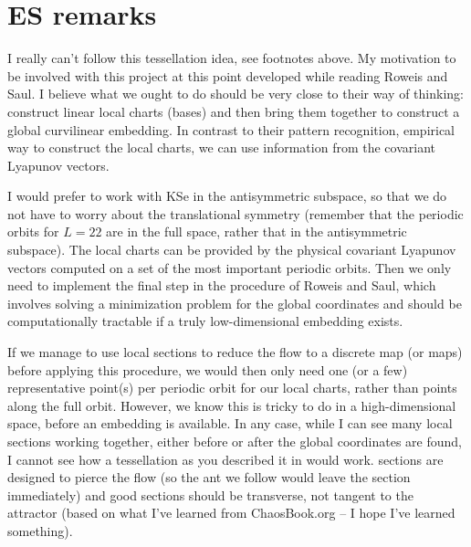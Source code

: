 \section{ES remarks}

I really can't follow this tessellation idea, see footnotes above. 
My motivation to be involved with this project at this point
developed while reading Roweis and Saul. I believe what we ought to 
do should be very close to their way of thinking: 
construct linear local charts (bases) and then bring them together 
to construct a global curvilinear embedding. In contrast to their pattern recognition, 
empirical way to construct the local charts, we can use information from
the covariant Lyapunov vectors.

I would prefer to work with KSe in the antisymmetric subspace, so that we do not
have to worry about the translational symmetry (remember that the periodic
orbits for $L=22$ are in the full space, rather that in the antisymmetric
subspace). 
The local charts can be provided by the physical covariant Lyapunov vectors 
computed on a set of the most important periodic orbits. Then we only need
to implement the final step in the procedure of Roweis and Saul, 
which involves solving a minimization problem for the global coordinates
and should be computationally tractable if a truly
low-dimensional embedding exists.

If we manage to use local {\Poincare} sections to reduce the flow to a discrete map
(or maps) before applying this procedure, we would then only need one (or a few)
representative point(s) per periodic orbit for our local charts, rather than 
points along the full orbit. However, we know this is tricky to do in a high-dimensional
space, before an embedding is available. In any case, while I can see many
local {\Poincare} sections working together, either before or after the global
coordinates are found, I cannot see how a tessellation as you described 
it in  would work. {\Poincare} sections are designed
to pierce the flow (so the ant we follow would leave the section immediately) 
and good sections should be transverse, not tangent to the attractor (based
on what I've learned from ChaosBook.org -- I hope I've learned something). 

\Remarks

